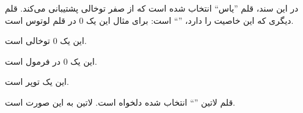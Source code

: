 \documentclass[a4paper]{book} %
\begin{document}
	در این سند، قلم ''یاس`` انتخاب شده است که از صفر توخالی پشتیبانی می‌کند. قلم دیگری که این خاصیت را دارد،
	''``
	است:
	{\IRLotusFont
	برای مثال این یک 0 در قلم لوتوس است.}
	\par
	این یک 0 توخالی است.
	\par
	این یک
	$0$
	در فرمول است.
	\par
	این یک
	{}
	توپر است.	
	\par
	قلم لاتین
	''``
	انتخاب شده دلخواه است. 
	لاتین به این صورت است.
\end{document}
